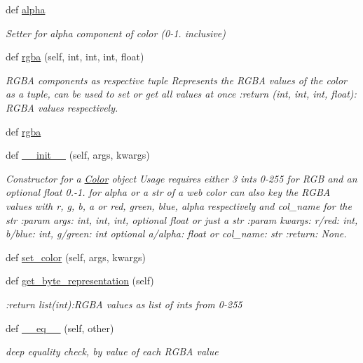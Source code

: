 \begin{DoxyCompactItemize}
def \mbox{\hyperlink{classbridges_1_1color_1_1_color_ab57c1e881ebb14bccefb870a9fa2ac1d}{alpha}}
\begin{DoxyCompactList}\small\item\em Setter for alpha component of color (0-\/1. inclusive) \end{DoxyCompactList}\item 
def \mbox{\hyperlink{classbridges_1_1color_1_1_color_a7653dfb80aa5ec25ed14314ffa79d1f2}{rgba}} (self, int, int, int, float)
\begin{DoxyCompactList}\small\item\em R\+G\+BA components as respective tuple Represents the R\+G\+BA values of the color as a tuple, can be used to set or get all values at once \+:return (int, int, int, float)\+: R\+G\+BA values respectively. \end{DoxyCompactList}\item 
def \mbox{\hyperlink{classbridges_1_1color_1_1_color_aa3d8dcfea52715f28400b08bf15e94ab}{rgba}}
\item 
def \mbox{\hyperlink{classbridges_1_1color_1_1_color_aacbbede0aceb8f1ca36d78379614bb1a}{\+\_\+\+\_\+init\+\_\+\+\_\+}} (self, args, kwargs)
\begin{DoxyCompactList}\small\item\em Constructor for a \mbox{\hyperlink{classbridges_1_1color_1_1_color}{Color}} object Usage requires either 3 ints 0-\/255 for R\+GB and an optional float 0.-\/1. for alpha or a str of a web color can also key the R\+G\+BA values with r, g, b, a or red, green, blue, alpha respectively and col\+\_\+name for the str \+:param args\+: int, int, int, optional float or just a str \+:param kwargs\+: r/red\+: int, b/blue\+: int, g/green\+: int optional a/alpha\+: float or col\+\_\+name\+: str \+:return\+: None. \end{DoxyCompactList}\item 
def \mbox{\hyperlink{classbridges_1_1color_1_1_color_a99b17a81feb1737f8b29c93ae9ef4bc8}{set\+\_\+color}} (self, args, kwargs)
\item 
def \mbox{\hyperlink{classbridges_1_1color_1_1_color_a30bc8e2023395c584eb256972abc7c1b}{get\+\_\+byte\+\_\+representation}} (self)
\begin{DoxyCompactList}\small\item\em \+:return list(int)\+:R\+G\+BA values as list of ints from 0-\/255 \end{DoxyCompactList}\item 
def \mbox{\hyperlink{classbridges_1_1color_1_1_color_ae5677a0858252f0b33da13866fb62786}{\+\_\+\+\_\+eq\+\_\+\+\_\+}} (self, other)
\begin{DoxyCompactList}\small\item\em deep equality check, by value of each R\+G\+BA value \end{DoxyCompactList}\end{DoxyCompactItemize}
